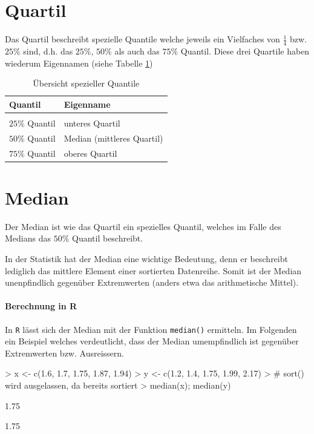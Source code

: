 \section{Quartil}
Das \gls{Quartil} beschreibt spezielle Quantile welche jeweils ein
Vielfaches von $\frac{1}{4}$ bzw. $25\%$ sind, d.h. das
$25\%$, $50\%$ als auch das $75\%$ Quantil. Diese drei Quartile haben 
wiederum Eigennamen (siehe Tabelle \ref{tab:quantile})
\begin{table}[h!]
	\centering
	\begin{tabular}{l l}
		Quantil &
			Eigenname \\
		\hline
		& \\
		$25\%$ Quantil
			& unteres Quartil \\
		$50\%$ Quantil
			& Median (mittleres Quartil) \\
		$75\%$ Quantil
			& oberes Quartil \\
	\end{tabular}
	\caption{Übersicht spezieller Quantile}
	\label{tab:quantile}
\end{table}

\section{Median}
Der \gls{Median} ist wie das \gls{Quartil} ein spezielles \gls{Quantil}, 
welches im Falle des Medians das $50\%$ Quantil beschreibt.

In der Statistik hat der Median eine wichtige Bedeutung, denn er 
beschreibt lediglich das mittlere Element einer sortierten Datenreihe.
Somit ist der Median unenpfindlich gegenüber Extremwerten (anders etwa 
das \gls{arithmetische Mittel}).

\paragraph{Berechnung in R}
In \lstinline{R} lässt sich der Median mit der Funktion 
\lstinline{median()} ermitteln. Im Folgenden ein Beispiel welches 
verdeutlicht, dass der Median umempfindlich ist gegenüber Extremwerten 
bzw. Ausreissern.
\begin{Schunk}
\begin{Sinput}
> x <- c(1.6, 1.7, 1.75, 1.87, 1.94)
> y <- c(1.2, 1.4, 1.75, 1.99, 2.17)
> # sort() wird ausgelassen, da bereits sortiert
> median(x); median(y)
\end{Sinput}
\begin{Soutput}
[1] 1.75
\end{Soutput}
\begin{Soutput}
[1] 1.75
\end{Soutput}
\end{Schunk}

